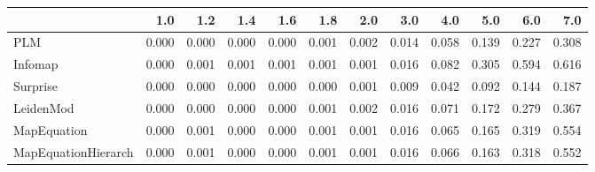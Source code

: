 \begin{tabular}{lrrrrrrrrrrr}
\toprule
{} &   1.0 &   1.2 &   1.4 &   1.6 &   1.8 &   2.0 &   3.0 &   4.0 &   5.0 &   6.0 &   7.0 \\
\midrule
PLM                 & 0.000 & 0.000 & 0.000 & 0.000 & 0.001 & 0.002 & 0.014 & 0.058 & 0.139 & 0.227 & 0.308 \\
Infomap             & 0.000 & 0.001 & 0.001 & 0.001 & 0.001 & 0.001 & 0.016 & 0.082 & 0.305 & 0.594 & 0.616 \\
Surprise            & 0.000 & 0.000 & 0.000 & 0.000 & 0.000 & 0.001 & 0.009 & 0.042 & 0.092 & 0.144 & 0.187 \\
LeidenMod           & 0.000 & 0.000 & 0.000 & 0.000 & 0.001 & 0.002 & 0.016 & 0.071 & 0.172 & 0.279 & 0.367 \\
MapEquation         & 0.000 & 0.001 & 0.000 & 0.000 & 0.001 & 0.001 & 0.016 & 0.065 & 0.165 & 0.319 & 0.554 \\
MapEquationHierarch & 0.000 & 0.001 & 0.000 & 0.000 & 0.001 & 0.001 & 0.016 & 0.066 & 0.163 & 0.318 & 0.552 \\
\bottomrule
\end{tabular}
